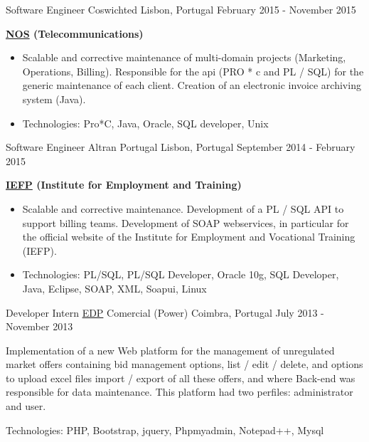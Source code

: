 \begin{cventries}
\cventry
{Software Engineer} %
{Coswichted} %
{Lisbon, Portugal} %
{February 2015 - November 2015} %
{ %
\begin{cvitems}
\item { \textbf{\href{https://www.nos.pt/}{NOS} (Telecommunications)}}
\begin{itemize}
\item {Scalable and corrective maintenance of multi-domain projects (Marketing, Operations, Billing).
Responsible for the api (PRO * c and PL / SQL) for the generic maintenance of each client. Creation of an electronic invoice archiving system (Java).}
\item {Technologies: Pro*C, Java, Oracle, SQL developer, Unix}
\end{itemize}
\end{cvitems}
}


\cventry
{Software Engineer} %
{Altran Portugal} %
{Lisbon, Portugal} %
{September 2014 - February 2015} %
{ %
\begin{cvitems}
\item { \textbf{\href{https://www.iefp.pt/}{IEFP} (Institute for Employment and Training)}}
\begin{itemize}
\item {Scalable and corrective maintenance. Development of a PL / SQL API to support billing teams. Development of SOAP webservices, in particular for the official website of the Institute for Employment and Vocational Training (IEFP).}
\item{Technologies: PL/SQL, PL/SQL Developer, Oracle 10g, SQL Developer, Java, Eclipse, SOAP, XML, Soapui, Linux}
\end{itemize}
\end{cvitems} 
}


\cventry
{Developer Intern} %
{\href{http://www.edp.pt/pt/Pages/homepage.aspx}{EDP} Comercial (Power)} %
{Coimbra, Portugal} %
{July 2013 - November 2013} %
{ %
\begin{cvitems}
\item {Implementation of a new Web platform for the management of unregulated market offers containing bid management options, list / edit / delete, and options to upload excel files import / export of all these offers, and where Back-end was responsible for data maintenance. This platform had two perfiles: administrator and user.}
\item{Technologies: PHP, Bootstrap, jquery, Phpmyadmin, Notepad++, Mysql}
\end{cvitems}
}


\end{cventries}
